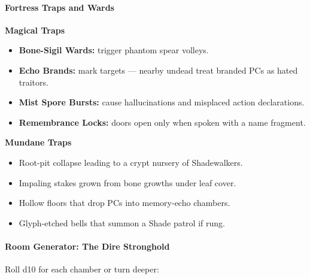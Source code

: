 \documentclass[11pt]{article}
\begin{document}
\paragraph{Fortress Traps and Wards}

\textbf{Magical Traps}
\begin{itemize}
  \item \textbf{Bone-Sigil Wards:} trigger phantom spear volleys.
  \item \textbf{Echo Brands:} mark targets --- nearby undead treat branded PCs as hated traitors.
  \item \textbf{Mist Spore Bursts:} cause hallucinations and misplaced action declarations.
  \item \textbf{Remembrance Locks:} doors open only when spoken with a name fragment.
\end{itemize}

\textbf{Mundane Traps}
\begin{itemize}
  \item Root-pit collapse leading to a crypt nursery of Shadewalkers.
  \item Impaling stakes grown from bone growths under leaf cover.
  \item Hollow floors that drop PCs into memory-echo chambers.
  \item Glyph-etched bells that summon a Shade patrol if rung.
\end{itemize}

\bigskip

\paragraph{Room Generator: The Dire Stronghold}

Roll d10 for each chamber or turn deeper:
\end{document}
